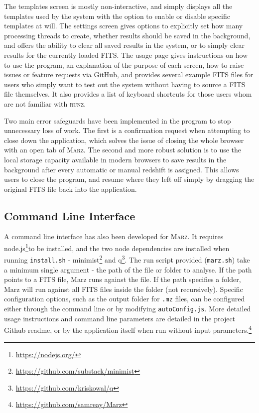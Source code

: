 \documentclass[5p]{elsarticle}
\newcommand{\runz}{\textsc{runz}}
\newcommand{\marz}{\textsc{Marz}}
\begin{document}
The templates screen is mostly non-interactive, and simply displays all the templates used by the system with the option to enable or disable specific templates at will. The settings screen gives options to explicitly set how many processing threads to create, whether results should be saved in the background, and offers the ability to clear all saved results in the system, or to simply clear results for the currently loaded FITS. The usage page gives instructions on how to use the program, an explanation of the purpose of each screen, how to raise issues or feature requests via GitHub, and provides several example FITS files for users who simply want to test out the system without having to source a FITS file themselves. It also provides a list of keyboard shortcuts for those users whom are not familiar with \runz{}.

Two main error safeguards have been implemented in the program to stop unnecessary loss of work. The first is a confirmation request when attempting to close down the application, which solves the issue of closing the whole browser with an open tab of \marz{}. The second and more robust solution is to use the local storage capacity available in modern browsers to save results in the background after every automatic or manual redshift is assigned. This allows users to close the program, and resume where they left off simply by dragging the original FITS file back into the application.\\






\subsection{Command Line Interface} \label{sec:commandline}

A command line interface has also been developed for \marz{}. It requires  node.js\footnote{\url{https://nodejs.org/}}to be installed, and the two node dependencies are installed when running \verb;install.sh; - minimist\footnote{\url{https://github.com/substack/minimist}} and q\footnote{\url{https://github.com/kriskowal/q}}. The run script provided (\verb;marz.sh;) take a minimum single argument - the path of the file or folder to analyse. If the path points to a FITS file, Marz runs against the file. If the path specifies a folder, Marz will run against all FITS files inside the folder (not recursively). Specific configuration options, such as the output folder for \verb;.mz; files, can be configured either through the command line or by modifying \verb;autoConfig.js;. More detailed usage instructions and command line parameters are detailed in the project Github readme, or by the application itself when run without input parameters.\footnote{\url{https://github.com/samreay/Marz}}\\
\end{document}
